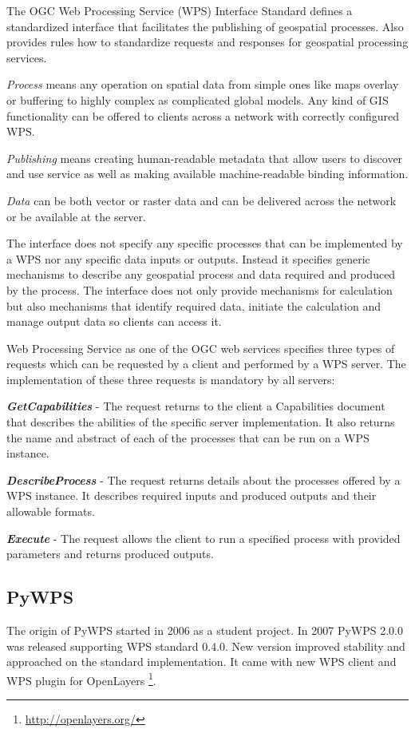 \documentclass{gifce}
\begin{document}
The OGC Web Processing Service (WPS) Interface Standard defines a standardized interface
that facilitates the publishing of geospatial processes. Also provides rules how to standardize
requests and responses for geospatial processing services. 

\textit{Process} means any operation on spatial
data from simple ones like maps overlay or buffering to highly complex as complicated global models. Any kind of GIS 
functionality can be offered to clients across a network with correctly configured WPS. 

\textit{Publishing} means
creating human-readable metadata that allow users to discover and use service as well as making 
available machine-readable binding information.

\textit{Data} can be both vector or raster data and can be delivered across the network or be available
at the server.

The interface does not specify any specific processes that can be implemented by a WPS nor any specific
data inputs or outputs. Instead it specifies generic mechanisms to describe any geospatial process and
data required and produced by the process. The interface does not only provide mechanisms for calculation
but also mechanisms that identify required data, initiate the calculation and manage output data so clients
can access it. 

\bigskip
Web Processing Service as one of the OGC web services specifies three types of requests which can be requested
by a client and performed by a WPS server. The implementation of these three requests is mandatory by all servers:

\textbf{\textit{GetCapabilities}} - The request returns to the client a Capabilities document that describes the abilities
of the specific server implementation. It also returns the name and abstract of each of the processes that can
be run on a WPS instance.

\textbf{\textit{DescribeProcess}} - The request returns details about the processes offered by a WPS instance. 
It describes required inputs and produced outputs and their allowable formats.

\textbf{\textit{Execute}} - The request allows the client to run a specified process with provided parameters and returns
produced outputs.


\subsection{PyWPS}
The origin of PyWPS started in 2006 as a student project. 
In 2007 PyWPS 2.0.0 was released supporting WPS standard 0.4.0. New
version improved stability and approached on the standard
implementation. It came with new WPS client and WPS plugin for
OpenLayers \footnote{\url{http://openlayers.org/}}.
\end{document}
